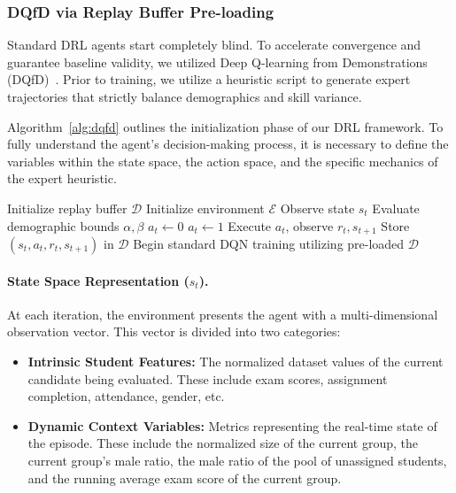 \documentclass{icai2026} %
\begin{document}
\subsubsection{DQfD via Replay Buffer Pre-loading}
Standard DRL agents start completely blind. To accelerate convergence and guarantee baseline validity, we utilized Deep Q-learning from Demonstrations (DQfD)~\cite{QLearing}. Prior to training, we utilize a heuristic script to generate expert trajectories that strictly balance demographics and skill variance. 

Algorithm~\ref{alg:dqfd} outlines the initialization phase of our DRL framework. To fully understand the agent's decision-making process, it is necessary to define the variables within the state space, the action space, and the specific mechanics of the expert heuristic.

\begin{algorithm}[!ht]
\caption{DQfD Replay Buffer Pre-loading}
\label{alg:dqfd}
\begin{algorithmic}[1]
\State Initialize replay buffer $\mathcal{D}$
\State Initialize environment $\mathcal{E}$
    \State Observe state $s_t$
    \State Evaluate demographic bounds $\alpha, \beta$
        \State $a_t \gets 0$ 
    \Else
        \State $a_t \gets 1$ 
    \EndIf
    \State Execute $a_t$, observe $r_t, s_{t+1}$
    \State Store $(s_t, a_t, r_t, s_{t+1})$ in $\mathcal{D}$
\EndFor
\State Begin standard DQN training utilizing pre-loaded $\mathcal{D}$
\end{algorithmic}
\end{algorithm}

\paragraph{State Space Representation ($s_t$).} 
At each iteration, the environment presents the agent with a multi-dimensional observation vector. This vector is divided into two categories:
\begin{itemize}
    \item \textbf{Intrinsic Student Features:} The normalized dataset values of the current candidate being evaluated.
    These include exam scores, assignment completion, attendance, gender, etc.
    \item \textbf{Dynamic Context Variables:} Metrics representing the real-time state of the episode. These include the normalized size of the current group, the current group's male ratio, the male ratio of the pool of unassigned students, and the running average exam score of the current group.
\end{itemize}
\end{document}
